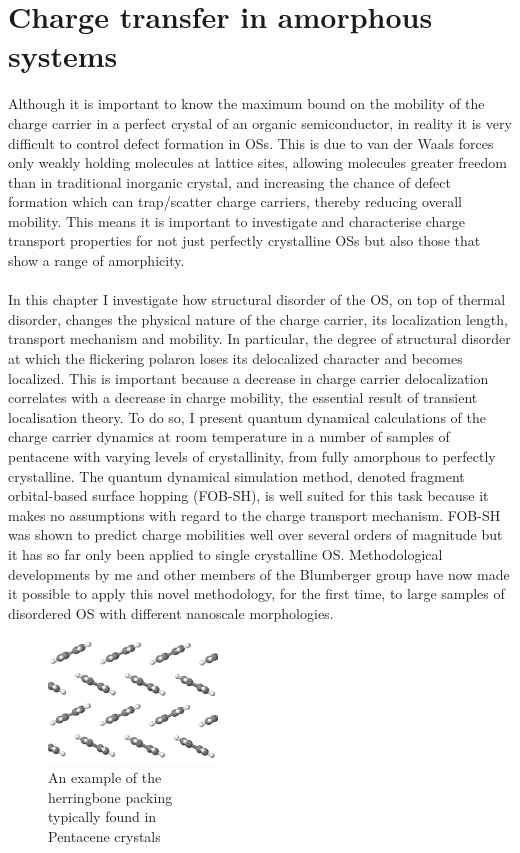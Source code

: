 \chapter{Charge transfer in amorphous systems}
\label{chap:surface_hopping_app}
Although it is important to know the maximum bound on the mobility of the charge carrier in a perfect crystal of an organic semiconductor, in reality it is very difficult to control defect formation in OSs\cite{NGUYEN2006198,Ray2014}. This is due to van der Waals forces only weakly holding molecules at lattice sites, allowing molecules greater freedom than in traditional inorganic crystal, and increasing the chance of defect formation which can trap/scatter charge carriers, thereby  reducing overall mobility. This means it is important to investigate and characterise charge transport properties for not just perfectly crystalline OSs but also those that show a range of amorphicity.
\\\\
In this chapter I investigate how structural disorder of the OS, on top of thermal disorder, changes the physical nature of the charge carrier, its localization length, transport mechanism and mobility. In particular, the degree of structural disorder at which the flickering polaron loses its delocalized character and becomes localized. This is important because a decrease in charge carrier delocalization correlates with a decrease in charge mobility, the essential result of transient localisation theory. To do so, I present quantum dynamical calculations of the charge carrier dynamics at room temperature in a number of samples of pentacene with varying levels of crystallinity, from fully amorphous to perfectly crystalline. The quantum dynamical simulation method, denoted fragment orbital-based surface hopping (FOB-SH), is well suited for this task because it makes no assumptions with regard to the charge transport mechanism. FOB-SH was shown to predict charge mobilities well over several orders of magnitude but it has so far only been applied to single crystalline OS. Methodological developments by me and other members of the Blumberger group have now made it possible to apply this novel methodology, for the first time, to large samples of disordered OS with different nanoscale morphologies.
\\
\begin{figure}
	\vspace*{-0.5cm}
	\includegraphics[width=0.4\textwidth]{../img/herringbone.png}
	\caption{An example of the \\herringbone packing \\typically found in \\Pentacene crystals}
	\label{fig:HerringbonePacking}
\end{figure}
